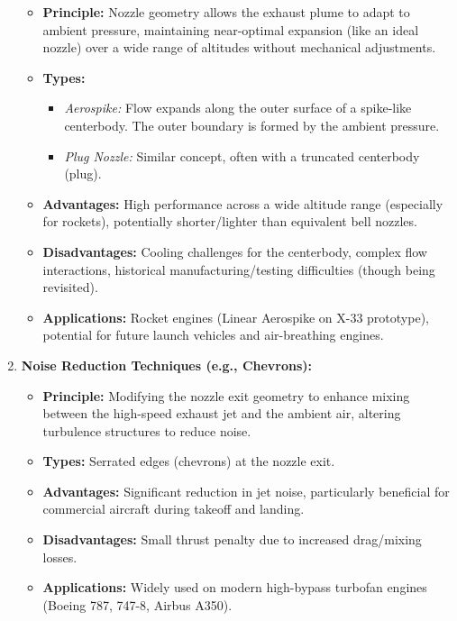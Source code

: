 \begin{enumerate}
  \begin{itemize}
  \tightlist
  \item
    \textbf{Principle:} Nozzle geometry allows the exhaust plume to
    adapt to ambient pressure, maintaining near-optimal expansion (like
    an ideal nozzle) over a wide range of altitudes without mechanical
    adjustments.
  \item
    \textbf{Types:}

    \begin{itemize}
    \tightlist
    \item
      \emph{Aerospike:} Flow expands along the outer surface of a
      spike-like centerbody. The outer boundary is formed by the ambient
      pressure.
    \item
      \emph{Plug Nozzle:} Similar concept, often with a truncated
      centerbody (plug).
    \end{itemize}
  \item
    \textbf{Advantages:} High performance across a wide altitude range
    (especially for rockets), potentially shorter/lighter than
    equivalent bell nozzles.
  \item
    \textbf{Disadvantages:} Cooling challenges for the centerbody,
    complex flow interactions, historical manufacturing/testing
    difficulties (though being revisited).
  \item
    \textbf{Applications:} Rocket engines (Linear Aerospike on X-33
    prototype), potential for future launch vehicles and air-breathing
    engines.
  \end{itemize}
\item
  \textbf{Noise Reduction Techniques (e.g., Chevrons):}

  \begin{itemize}
  \tightlist
  \item
    \textbf{Principle:} Modifying the nozzle exit geometry to enhance
    mixing between the high-speed exhaust jet and the ambient air,
    altering turbulence structures to reduce noise.
  \item
    \textbf{Types:} Serrated edges (chevrons) at the nozzle exit.
  \item
    \textbf{Advantages:} Significant reduction in jet noise,
    particularly beneficial for commercial aircraft during takeoff and
    landing.
  \item
    \textbf{Disadvantages:} Small thrust penalty due to increased
    drag/mixing losses.
  \item
    \textbf{Applications:} Widely used on modern high-bypass turbofan
    engines (Boeing 787, 747-8, Airbus A350).
  \end{itemize}
\end{enumerate}

